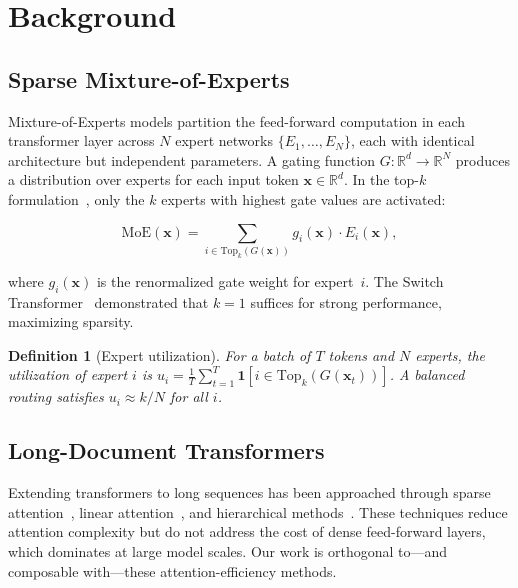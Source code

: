 \documentclass[11pt,a4paper]{article}
\newcommand{\R}{\mathbb{R}}
\newtheorem{definition}{Definition}
\begin{document}
\section{Background}
\label{sec:background}

\subsection{Sparse Mixture-of-Experts}

Mixture-of-Experts models partition the feed-forward computation in each transformer layer
across $N$ expert networks $\{E_1, \ldots, E_N\}$, each with identical architecture but
independent parameters.
A gating function $G: \R^d \to \R^N$ produces a distribution over experts for each input
token $\mathbf{x} \in \R^d$.
In the top-$k$ formulation~\cite{shazeer2017outrageously}, only the $k$ experts with highest
gate values are activated:

\begin{equation}
\label{eq:topk}
  \text{MoE}(\mathbf{x}) = \sum_{i \in \text{Top}_k(G(\mathbf{x}))} g_i(\mathbf{x}) \cdot E_i(\mathbf{x}),
\end{equation}

\noindent where $g_i(\mathbf{x})$ is the renormalized gate weight for expert~$i$.
The Switch Transformer~\cite{fedus2022switch} demonstrated that $k=1$ suffices for strong
performance, maximizing sparsity.

\begin{definition}[Expert utilization]
\label{def:utilization}
For a batch of $T$ tokens and $N$ experts, the utilization of expert $i$ is
$u_i = \frac{1}{T}\sum_{t=1}^{T} \mathbf{1}[i \in \text{Top}_k(G(\mathbf{x}_t))]$.
A balanced routing satisfies $u_i \approx k/N$ for all $i$.
\end{definition}

\subsection{Long-Document Transformers}

Extending transformers to long sequences has been approached through sparse
attention~\cite{child2019sparsetransformer,beltagy2020longformer}, linear
attention~\cite{katharopoulos2020transformers}, and hierarchical
methods~\cite{zhang2019hibert,liu2019hierarchical}.
These techniques reduce attention complexity but do not address the cost of dense
feed-forward layers, which dominates at large model scales.
Our work is orthogonal to---and composable with---these attention-efficiency methods.
\end{document}
